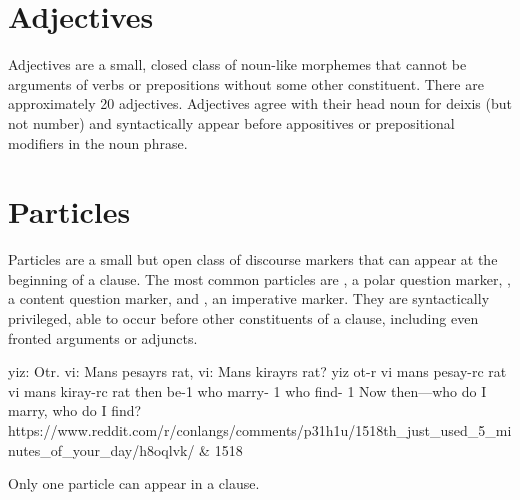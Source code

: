 \setchapterpreamble[u]{\margintoc}
\chapter{Adjectives}
Adjectives are a small, closed class of noun-like morphemes that cannot be arguments of verbs or prepositions without some other constituent. There are approximately 20 adjectives. Adjectives agree with their head noun for deixis (but not number) and syntactically appear before appositives or prepositional modifiers in the noun phrase.

\setchapterpreamble[u]{\margintoc}
\chapter{Particles}
Particles are a small but open class of discourse markers that can appear at the beginning of a clause. The most common particles are , a polar question marker, , a content question marker, and , an imperative marker. They are syntactically privileged, able to occur before other constituents of a clause, including even fronted arguments or adjuncts.

\begin{example*}
    \script yiz: Otr. vi: Mans pesayrs rat, vi: Mans kirayrs rat?
    \bits  yiz ot-r vi mans pesay-rc rat vi mans kiray-rc rat
    \gloss then be-{1}  who marry- {1}  who find- {1}
    \tr Now then---who do I marry, who do I find?
    \smoyd https://www.reddit.com/r/conlangs/comments/p31h1u/1518th_just_used_5_minutes_of_your_day/h8oqlvk/ & 1518
\end{example*}  

Only one particle can appear in a clause.




